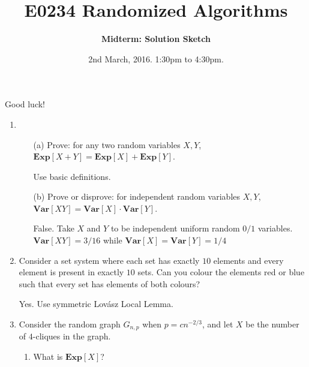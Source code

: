 \documentclass[11pt]{article}
\def\Exp{\mathbf{Exp}}
\def\Var{\mathbf{Var}}
\def\Exp{\mathbf{Exp}}
\def\Var{\mathbf{Var}}
\begin{document}
\title{E0234 Randomized Algorithms}
\author{\bf Midterm: Solution Sketch}
\date{2nd March, 2016. 1:30pm to 4:30pm.}
\maketitle
\thispagestyle{empty}
\def\poly{{\tt poly}}
\begin{center}
{\small 
Good luck!
}


\end{center}

\begin{enumerate}
	

\item 
\begin{enumerate}
\item[(a)] Prove: for any two random variables $X,Y$, $\Exp[X+Y] = \Exp[X] + \Exp[Y]$.

Use basic definitions.

\item[(b)]
Prove or disprove: for independent random variables $X,Y$, \mbox{$\Var[XY] = \Var[X]\cdot \Var[Y]$.}

False. Take $X$ and $Y$ to be independent uniform random $0/1$ variables. $\Var[XY] = 3/16$ while $\Var[X] = \Var[Y] = 1/4$

\end{enumerate}
\vspace{0.5ex}

\item 
Consider a set system where each set has exactly $10$ elements and every element is present in exactly $10$ sets. 
Can you colour the elements red or blue such that every set has elements of both colours?

Yes. Use symmetric Lov\'asz Local Lemma.
%
\vspace{0.5ex}

\item Consider the random graph $G_{n,p}$ when $p = cn^{-2/3}$, and let $X$ be the number of $4$-cliques in the graph. 
\begin{enumerate}
	\item  What is $\Exp[X]$?
	

\end{enumerate}
\end{enumerate}
\end{document}

